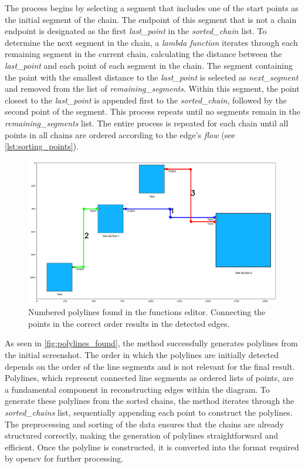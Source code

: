 The process begins by selecting a segment that includes one of the start points as the initial segment of the chain. The endpoint of this segment that is not a chain endpoint is designated as the first \textit{last\_point} in the \textit{sorted\_chain} list. To determine the next segment in the chain, a \textit{lambda function} iterates through each remaining segment in the current chain, calculating the distance between the \textit{last\_point} and each point of each segment in the chain. The segment containing the point with the smallest distance to the \textit{last\_point} is selected as \textit{next\_segment} and removed from the list of \textit{remaining\_segments}. Within this segment, the point closest to the \textit{last\_point} is appended first to the \textit{sorted\_chain}, followed by the second point of the segment. This process repeats until no segments remain in the \textit{remaining\_segments} list. The entire process is repeated for each chain until all points in all chains are ordered according to the edge's \textit{flow} (see \autoref{lst:sorting_points}).

\begin{figure}[h]
    \centering
    \includegraphics[width=0.7\linewidth]{pictures/polylines_found.png}
    \caption[Numbered polylines found in the functions editor]{Numbered polylines found in the functions editor. Connecting the points in the correct order results in the detected edges.}
    \label{fig:polylines_found}
\end{figure}
As seen in \autoref{fig:polylines_found}, the method successfully generates polylines from the initial screenshot. The order in which the polylines are initially detected depends on the order of the line segments and is not relevant for the final result.\\
Polylines, which represent connected line segments as ordered lists of points, are a fundamental component in reconstructing edges within the diagram. To generate these polylines from the sorted chains, the method iterates through the \textit{sorted\_chains} list, sequentially appending each point to construct the polylines. The preprocessing and sorting of the data ensures that the chains are already structured correctly, making the generation of polylines straightforward and efficient. Once the polyline is constructed, it is converted into the format required by \acrshort{opencv} for further processing.

